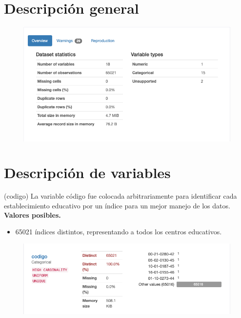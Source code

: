 






\section{Descripción general}
	\begin{figure}[H]
	\centering
	\includegraphics[scale=0.5]{Images/0}
\end{figure}

\newpage

\section{Descripción de variables}

\begin{variable}(codigo) 
	La variable código fue colocada arbitrariamente para identificar cada establecimiento educativo por un índice para un mejor manejo de los datos.
	\bigbreak 
	\textbf{Valores posibles.}
	\begin{itemize}
		\item 65021 índices distintos, representando a todos los centros educativos. 
	\end{itemize}
	\begin{figure}[H]
		\centering
		\includegraphics[scale=0.5]{Images/1}
	\end{figure}
\end{variable}

